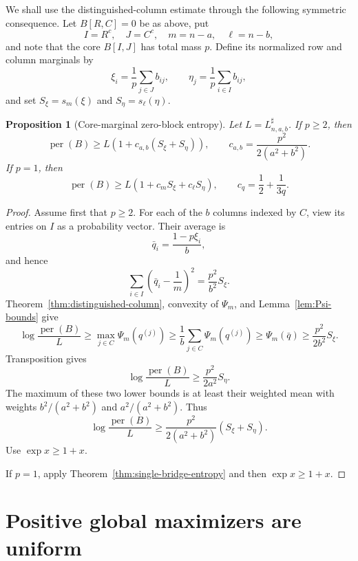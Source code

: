 \documentclass[11pt]{article}
\newtheorem{proposition}[theorem]{Proposition}
\theoremstyle{definition}
\newcommand{\per}{\operatorname{per}}
\newcommand{\1}{\mathbf{1}}
\begin{document}
We shall use the distinguished-column estimate through the following
symmetric consequence.  Let $B[R,C]=0$ be as above, put
\[
 I=R^c,\quad J=C^c,\quad m=n-a,\quad \ell=n-b,
\]
and note that the core $B[I,J]$ has total mass $p$.  Define its normalized
row and column marginals by
\[
 \xi_i=\frac1p\sum_{j\in J}b_{ij},
 \qquad
 \eta_j=\frac1p\sum_{i\in I}b_{ij},
\]
and set $S_\xi=s_m(\xi)$ and $S_\eta=s_\ell(\eta)$.

\begin{proposition}[Core-marginal zero-block entropy]
\label{prop:core-marginal-entropy}
Let $L=L^{\sharp}_{n,a,b}$.  If $p\ge2$, then
\begin{equation}\label{eq:core-entropy-general}
 \per(B)\ge
 L\left(1+c_{a,b}(S_\xi+S_\eta)\right),
 \qquad
 c_{a,b}=\frac{p^2}{2(a^2+b^2)}.
\end{equation}
If $p=1$, then
\begin{equation}\label{eq:core-entropy-p1}
 \per(B)\ge
 L\left(1+c_mS_\xi+c_\ell S_\eta\right),
 \qquad c_q=\frac12+\frac1{3q}.
\end{equation}
\end{proposition}

\begin{proof}
Assume first that $p\ge2$.  For each of the $b$ columns indexed by $C$,
view its entries on $I$ as a probability vector.  Their average is
\[
 \bar q_i=\frac{1-p\xi_i}{b},
\]
and hence
\[
 \sum_{i\in I}\left(\bar q_i-\frac1m\right)^2
 =\frac{p^2}{b^2}S_\xi.
\]
Theorem~\ref{thm:distinguished-column}, convexity of $\Psi_m$, and
Lemma~\ref{lem:Psi-bounds} give
\[
 \log\frac{\per(B)}L
 \ge\max_{j\in C}\Psi_m(q^{(j)})
 \ge\frac1b\sum_{j\in C}\Psi_m(q^{(j)})
 \ge\Psi_m(\bar q)
 \ge\frac{p^2}{2b^2}S_\xi.
\]
Transposition gives
\[
 \log\frac{\per(B)}L\ge\frac{p^2}{2a^2}S_\eta.
\]
The maximum of these two lower bounds is at least their weighted mean with
weights $b^2/(a^2+b^2)$ and $a^2/(a^2+b^2)$.  Thus
\[
 \log\frac{\per(B)}L
 \ge\frac{p^2}{2(a^2+b^2)}(S_\xi+S_\eta).
\]
Use $\exp x\ge1+x$.

If $p=1$, apply Theorem~\ref{thm:single-bridge-entropy} and then
$\exp x\ge1+x$.
\end{proof}

\renewcommand{\theequation}{\arabic{equation}}
\renewcommand{\theHequation}{\arabic{equation}}


\section{Positive global maximizers are uniform}\label{sec:positive}
\end{document}
